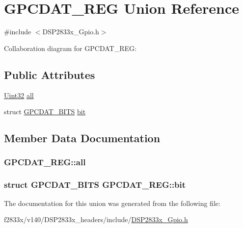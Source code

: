 \hypertarget{union_g_p_c_d_a_t___r_e_g}{}\section{G\+P\+C\+D\+A\+T\+\_\+\+R\+E\+G Union Reference}
\label{union_g_p_c_d_a_t___r_e_g}


{\ttfamily \#include $<$D\+S\+P2833x\+\_\+\+Gpio.\+h$>$}



Collaboration diagram for G\+P\+C\+D\+A\+T\+\_\+\+R\+E\+G\+:
\subsection*{Public Attributes}
\begin{DoxyCompactItemize}
\item 
\hyperlink{_d_s_p2833x___device_8h_aba99025e657f892beb7ff31cecf64653}{Uint32} \hyperlink{union_g_p_c_d_a_t___r_e_g_aa8843e04651c64a96df425637c1d700c}{all}
\item 
struct \hyperlink{struct_g_p_c_d_a_t___b_i_t_s}{G\+P\+C\+D\+A\+T\+\_\+\+B\+I\+T\+S} \hyperlink{union_g_p_c_d_a_t___r_e_g_a98968974f5ec50d64daf61fd8f073608}{bit}
\end{DoxyCompactItemize}


\subsection{Member Data Documentation}
\hypertarget{union_g_p_c_d_a_t___r_e_g_aa8843e04651c64a96df425637c1d700c}{}
\subsubsection[{all}]{ G\+P\+C\+D\+A\+T\+\_\+\+R\+E\+G\+::all}\label{union_g_p_c_d_a_t___r_e_g_aa8843e04651c64a96df425637c1d700c}
\hypertarget{union_g_p_c_d_a_t___r_e_g_a98968974f5ec50d64daf61fd8f073608}{}
\subsubsection[{bit}]{\setlength{\rightskip}{0pt plus 5cm}struct {\bf G\+P\+C\+D\+A\+T\+\_\+\+B\+I\+T\+S} G\+P\+C\+D\+A\+T\+\_\+\+R\+E\+G\+::bit}\label{union_g_p_c_d_a_t___r_e_g_a98968974f5ec50d64daf61fd8f073608}


The documentation for this union was generated from the following file\+:\begin{DoxyCompactItemize}
\item 
f2833x/v140/\+D\+S\+P2833x\+\_\+headers/include/\hyperlink{_d_s_p2833x___gpio_8h}{D\+S\+P2833x\+\_\+\+Gpio.\+h}\end{DoxyCompactItemize}
